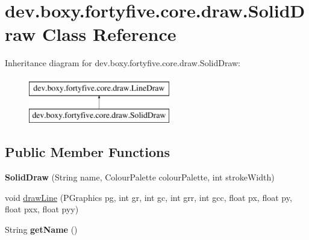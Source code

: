 \hypertarget{classdev_1_1boxy_1_1fortyfive_1_1core_1_1draw_1_1_solid_draw}{
\section{dev.boxy.fortyfive.core.draw.SolidDraw Class Reference}
\label{d6/d0a/classdev_1_1boxy_1_1fortyfive_1_1core_1_1draw_1_1_solid_draw}
}
Inheritance diagram for dev.boxy.fortyfive.core.draw.SolidDraw:\begin{figure}[H]
\begin{center}
\leavevmode
\includegraphics[height=2.000000cm]{d6/d0a/classdev_1_1boxy_1_1fortyfive_1_1core_1_1draw_1_1_solid_draw}
\end{center}
\end{figure}
\subsection*{Public Member Functions}
\begin{DoxyCompactItemize}
\item 
\hypertarget{classdev_1_1boxy_1_1fortyfive_1_1core_1_1draw_1_1_solid_draw_a2ada286a06cb41082239f7b882ec636e}{
{\bfseries SolidDraw} (String name, ColourPalette colourPalette, int strokeWidth)}
\label{d6/d0a/classdev_1_1boxy_1_1fortyfive_1_1core_1_1draw_1_1_solid_draw_a2ada286a06cb41082239f7b882ec636e}

\item 
void \hyperlink{classdev_1_1boxy_1_1fortyfive_1_1core_1_1draw_1_1_solid_draw_a935ee49017085b52190e77e0b56e6121}{drawLine} (PGraphics pg, int gr, int gc, int grr, int gcc, float px, float py, float pxx, float pyy)
\item 
\hypertarget{classdev_1_1boxy_1_1fortyfive_1_1core_1_1draw_1_1_solid_draw_a625bbbf5d92140c1a84b53c772c75c73}{
String {\bfseries getName} ()}
\label{d6/d0a/classdev_1_1boxy_1_1fortyfive_1_1core_1_1draw_1_1_solid_draw_a625bbbf5d92140c1a84b53c772c75c73}

\end{DoxyCompactItemize}

